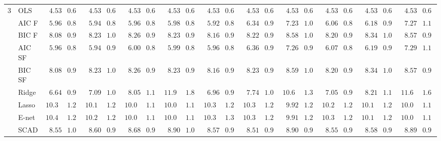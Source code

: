 \begin{tabular}{ll|ll|llllll|llllll|llllll}
3 & OLS  & $\phantom{0}4.53$ & $0.63$ & $\phantom{0}4.53$ & $0.63$ & $\phantom{0}4.53$ & $0.63$ & $\phantom{0}4.53$ & $0.63$ & $\phantom{0}4.53$ & $0.63$ & $\phantom{0}4.53$ & $0.63$ & $\phantom{0}4.53$ & $0.63$ & $\phantom{0}4.53$ & $0.63$ & $\phantom{0}4.53$ & $0.63$ & $\phantom{0}4.53$ & $0.63$ \\
 & AIC F  & $\phantom{0}5.96$ & $0.87$ & $\phantom{0}5.94$ & $0.88$ & $\phantom{0}5.96$ & $0.88$ & $\phantom{0}5.98$ & $0.85$ & $\phantom{0}5.92$ & $0.87$ & $\phantom{0}6.34$ & $0.90$ & $\phantom{0}7.23$ & $1.01$ & $\phantom{0}6.06$ & $0.88$ & $\phantom{0}6.18$ & $0.97$ & $\phantom{0}7.27$ & $1.17$ \\
 & BIC F  & $\phantom{0}8.08$ & $0.99$ & $\phantom{0}8.23$ & $1.03$ & $\phantom{0}8.26$ & $0.95$ & $\phantom{0}8.23$ & $0.96$ & $\phantom{0}8.16$ & $0.95$ & $\phantom{0}8.22$ & $0.99$ & $\phantom{0}8.58$ & $1.01$ & $\phantom{0}8.20$ & $0.91$ & $\phantom{0}8.34$ & $1.01$ & $\phantom{0}8.57$ & $0.93$ \\
 & AIC SF  & $\phantom{0}5.96$ & $0.86$ & $\phantom{0}5.94$ & $0.91$ & $\phantom{0}6.00$ & $0.87$ & $\phantom{0}5.99$ & $0.84$ & $\phantom{0}5.96$ & $0.86$ & $\phantom{0}6.36$ & $0.93$ & $\phantom{0}7.26$ & $0.97$ & $\phantom{0}6.07$ & $0.87$ & $\phantom{0}6.19$ & $0.96$ & $\phantom{0}7.29$ & $1.15$ \\
 & BIC SF  & $\phantom{0}8.08$ & $0.99$ & $\phantom{0}8.23$ & $1.03$ & $\phantom{0}8.26$ & $0.94$ & $\phantom{0}8.23$ & $0.96$ & $\phantom{0}8.16$ & $0.95$ & $\phantom{0}8.23$ & $0.99$ & $\phantom{0}8.59$ & $1.01$ & $\phantom{0}8.20$ & $0.91$ & $\phantom{0}8.34$ & $1.00$ & $\phantom{0}8.57$ & $0.93$ \\
 & Ridge  & $\phantom{0}6.64$ & $0.97$ & $\phantom{0}7.09$ & $1.06$ & $\phantom{0}8.05$ & $1.15$ & $11.95$ & $1.80$ & $\phantom{0}6.96$ & $0.99$ & $\phantom{0}7.74$ & $1.02$ & $10.66$ & $1.36$ & $\phantom{0}7.05$ & $0.93$ & $\phantom{0}8.21$ & $1.10$ & $11.67$ & $1.66$ \\
 & Lasso  & $10.30$ & $1.25$ & $10.18$ & $1.21$ & $10.06$ & $1.18$ & $10.05$ & $1.16$ & $10.30$ & $1.26$ & $10.33$ & $1.26$ & $\phantom{0}9.92$ & $1.21$ & $10.25$ & $1.20$ & $10.13$ & $1.20$ & $10.00$ & $1.15$ \\
 & E-net  & $10.40$ & $1.29$ & $10.22$ & $1.21$ & $10.06$ & $1.19$ & $10.06$ & $1.13$ & $10.35$ & $1.32$ & $10.37$ & $1.29$ & $\phantom{0}9.91$ & $1.20$ & $10.32$ & $1.25$ & $10.13$ & $1.21$ & $10.04$ & $1.19$ \\
 & SCAD  & $\phantom{0}8.55$ & $1.04$ & $\phantom{0}8.60$ & $0.98$ & $\phantom{0}8.68$ & $0.91$ & $\phantom{0}8.90$ & $1.03$ & $\phantom{0}8.57$ & $0.98$ & $\phantom{0}8.51$ & $0.96$ & $\phantom{0}8.90$ & $0.95$ & $\phantom{0}8.55$ & $0.93$ & $\phantom{0}8.58$ & $0.93$ & $\phantom{0}8.89$ & $0.96$ \\

\end{tabular}
